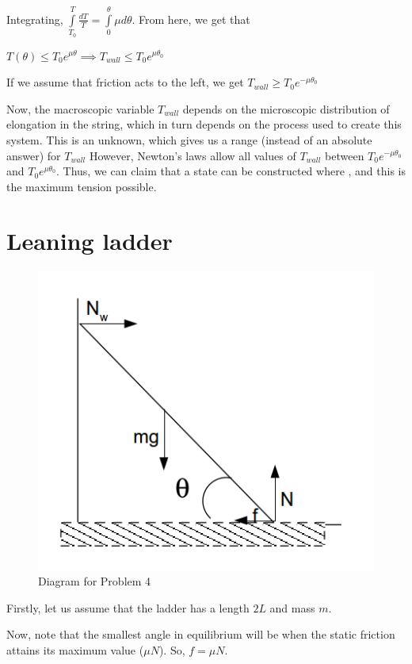 \documentclass[12pt]{article}
\begin{document}
Integrating, $\int\limits_{T_0}^T \frac{dT}{T}=\int\limits_0^\theta \mu d\theta$. From here, we get that 

$T(\theta)\leq T_0e^{\mu\theta}\implies T_{wall}\leq T_0e^{\mu\theta_0}$

If we assume that friction acts to the left, we get $T_{wall}\geq T_0e^{-\mu\theta_0}$

Now, the macroscopic variable $T_{wall}$ depends on the microscopic distribution of elongation in the string, which in turn depends on the process used to create this system. This is an unknown, which gives us a range (instead of an absolute answer) for $T_{wall}$ However, Newton's laws allow all values of $T_{wall}$ between $T_0e^{-\mu\theta_0}$ and $T_0e^{\mu\theta_0}$. Thus, we can claim that a state can be constructed where , and this is the maximum tension possible.

\section{Leaning ladder}
\begin{figure}[h]
\centering
\includegraphics[scale=0.6]{4D}
\caption{Diagram for Problem 4}

\label{fig:4d}
\end{figure}

Firstly, let us assume that the ladder has a length $2L$ and mass $m$. 

Now, note that the smallest angle in equilibrium will be  when the static friction attains its maximum value ($\mu N$). So, $f=\mu N$.
\end{document}
